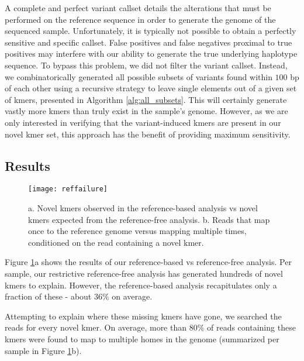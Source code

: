 A complete and perfect variant callset details the alterations that must be performed on the reference sequence in order to generate the genome of the sequenced sample.  Unfortunately, it is typically not possible to obtain a perfectly sensitive and specific callset.  False positives and false negatives proximal to true positives may interfere with our ability to generate the true underlying haplotype sequence.  To bypass this problem, we did not filter the variant callset.  Instead, we combinatorically generated all possible subsets of variants found within $100$ bp of each other using a recursive strategy to leave single elements out of a given set of kmers, presented in Algorithm \ref{alg:all_subsets}.  This will certainly generate vastly more kmers than truly exist in the sample's genome.  However, as we are only interested in verifying that the variant-induced kmers are present in our novel kmer set, this approach has the benefit of providing maximum sensitivity.

\subsection{Results}

\begin{figure}[h!]
  \centering
    \texttt{[image: reffailure]}
  \caption{a. Novel kmers observed in the reference-based analysis vs novel kmers expected from the reference-free analysis.  b. Reads that map once to the reference genome versus mapping multiple times, conditioned on the read containing a novel kmer.}
  \label{fig:reffailure}
\end{figure}


Figure \ref{fig:reffailure}a shows the results of our reference-based vs reference-free analysis.  Per sample, our restrictive reference-free analysis has generated hundreds of novel kmers to explain.  However, the reference-based analysis recapitulates only a fraction of these - about $36\%$ on average.

Attempting to explain where these missing kmers have gone, we searched the reads for every novel kmer.  On average, more than $80\%$ of reads containing these kmers were found to map to multiple homes in the genome (summarized per sample in Figure \ref{fig:reffailure}b).

